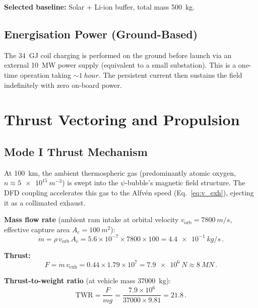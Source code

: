 \documentclass[11pt,a4paper]{article}
\begin{document}
\textbf{Selected baseline:} Solar + Li-ion buffer, total mass \SI{500}{kg}.

\subsection{Energisation Power (Ground-Based)}

The \SI{34}{GJ} coil charging is performed on the ground before launch
via an external \SI{10}{MW} power supply (equivalent to a small substation).
This is a one-time operation taking $\sim\!\SI{1}{hour}$. The persistent
current then sustains the field indefinitely with zero on-board power.

\section{Thrust Vectoring and Propulsion}\label{sec:thrust}

\subsection{Mode I Thrust Mechanism}

At \SI{100}{km}, the ambient thermospheric gas (predominantly atomic oxygen,
$n \approx \SI{5e15}{m^{-3}}$) is swept into the $\psi$-bubble's magnetic
field structure. The DFD coupling accelerates this gas to the Alfv\'en speed
(Eq.~\ref{eq:v_exh}), ejecting it as a collimated exhaust.

\textbf{Mass flow rate} (ambient ram intake at orbital velocity
$v_{\mathrm{orb}} = \SI{7800}{m/s}$, effective capture area $A_c = \SI{100}{m^2}$):
\begin{equation}
\dot{m} = \rho \, v_{\mathrm{orb}} \, A_c
= 5.6 \times 10^{-7} \times 7800 \times 100
= \SI{4.4e-1}{kg/s}\,.
\end{equation}

\textbf{Thrust:}
\begin{equation}
F = \dot{m} \, v_{\mathrm{exh}}
= 0.44 \times 1.79 \times 10^7
= \SI{7.9e6}{N} \approx \SI{8}{MN}\,.
\end{equation}

\textbf{Thrust-to-weight ratio} (at vehicle mass \SI{37000}{kg}):
\begin{equation}
\mathrm{TWR} = \frac{F}{mg} = \frac{7.9 \times 10^6}{37000 \times 9.81} = 21.8\,.
\end{equation}
\end{document}
